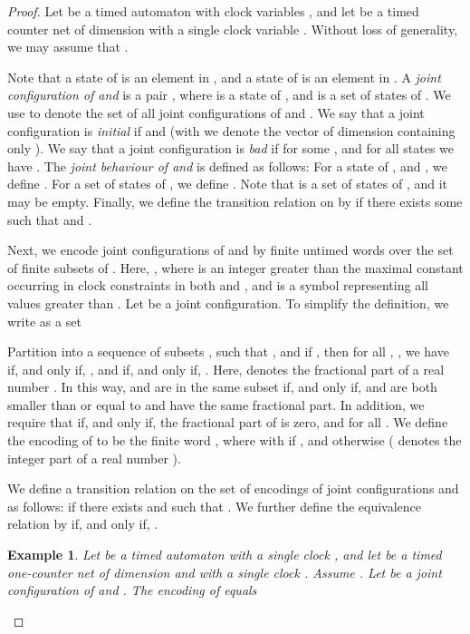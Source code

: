 \documentclass{CSML}
\theoremstyle{plain}\newtheorem{theorem}[thm]{Theorem}
\theoremstyle{plain}\newtheorem{corollary}[thm]{Corollary}
\theoremstyle{plain}\newtheorem{example}[thm]{Example}
\theoremstyle{plain}\newtheorem{lemma}[thm]{Lemma}
\theoremstyle{plain}\newtheorem{remark}[thm]{Remark}
\begin{document}
\begin{proof}
		
		
		Let  be a timed automaton with clock variables , 
		and let  be a timed counter net of dimension  with a single clock variable .
		Without loss of generality, we may assume that . 


		Note that a state  of  is an element in , 
		and a state  of  is an element in .		
		A \emph{joint configuration of  and } is a
		pair , where  is a state of , and  is a set of states of .
		We use  to denote the set of all joint configurations of  and . 		
		We say that a joint configuration  is \emph{initial} if  and  (with 
		 we denote the vector of dimension  containing only ).
		We say that a joint configuration  is \emph{bad} if  for some , and for all states  we have . 
		The \emph{joint behaviour of  and } is defined as follows: 
		For a state  of ,  and , 
		we define .
For a set  of states of , we define 
		. Note that  is a set of states of , and it may be empty. 
		Finally, we define the transition relation  on  by   if there exists some  such that  and  . 
		
		
		Next, we encode joint configurations of  and  by  finite untimed words over the set  of finite subsets of .
		Here, 	
		, where  is an integer greater than the maximal constant occurring in clock constraints in both  and , and  is a symbol representing all values greater than . 
		Let 
		be a joint configuration.		
		To simplify the definition, we write  as a set 
		
		Partition  into a sequence of subsets 
		,
		such that , and
		if ,
		then for all , , 
		we have  if, and only if, , and 
		 if, and only if, . Here,  denotes the fractional part of a real number . 		
		In this way,    and  are in the same subset  if, and only if,  and  are both smaller than or equal to  and have the same fractional part. 
		In addition, we require that 
		 if, and only if, the fractional part of  is zero, and
		 for all . 
		We define the encoding  of  to be  the finite word 
		, 
		where  with  if , and  otherwise ( denotes the integer part of a real number ). 
		
		
		We define a transition relation  on the set of encodings of joint configurations and  as follows:  if there exists  and  such that . 
		We further define the equivalence relation  by  if, and only if, .
		\begin{example}
			Let  be a timed automaton with a single clock , and let  be a timed one-counter net of dimension  and with a single clock . Assume . 
			Let  be a joint configuration of  and . 
			The encoding of  equals 
			

\end{example}
\end{proof}
\end{document}
